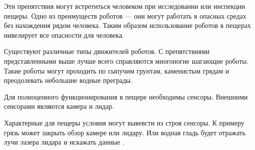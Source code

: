 Эти препятствия могут встретиться человеком при исследовании или инспекции пещеры. Одно из преимуществ роботов --- они могут работать в опасных средах без нахождения рядом человека. Таким образом использование роботов в пещерах нивелирует все опасности для человека.

Существуют различные типы движителей роботов. С препятствиями представленными выше лучше всего справляются многоногие шагающие роботы. Такие роботы могут проходить по сыпучим грунтам, каменистым грядам и преодолевать небольшие водные преграды.

Для полноценного функционирования в пещере необходимы сенсоры. Внешними сенсорами являются камера и лидар.

Характерные для пещеры условия могут вывевсти из строя сенсоры. К примеру грязь  может закрыть обзор камере или лидару. Или водная гладь  будет отражать лучи лазера лидара и искажать данные .

